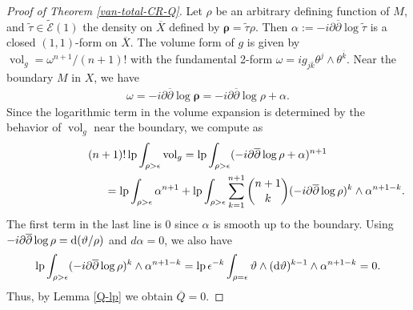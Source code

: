 \documentclass[pdftex]{sigma}
\numberwithin{equation}{section}
\begin{document}
\begin{proof}[Proof of Theorem \ref{van-total-CR-Q}] Let $\rho$ be an arbitrary def\/ining function of $M$, and $\widetilde\tau\in\widetilde{\mathcal{E}} (1)$ the density on $\overline X$ def\/ined by $\boldsymbol\rho=\widetilde\tau\rho$. Then $\alpha:=-i\partial\overline{\partial}\log\widetilde\tau$ is a closed $(1,1)$-form on $\overline X$. The volume form of $g$ is given by $\operatorname{vol}_g=\omega^{n+1}/(n+1)!$ with the fundamental 2-form $\omega=ig_{j\overline k}\theta^j\wedge\theta^{\overline k}$. Near the boundary $M$ in $X$, we have
\begin{gather*}
\omega=-i\partial\overline{\partial}\log\boldsymbol\rho=-i\partial\overline{\partial}\log\rho+\alpha.
\end{gather*}
Since the logarithmic term in the volume expansion is determined by the behavior of $\operatorname{vol}_g$ near the boundary, we compute as
\begin{gather*}
(n+1)! \operatorname{lp}\int_{\rho>\epsilon} \operatorname{vol}_g
 = \operatorname{lp}\int_{\rho>\epsilon} (-i\partial\overline{\partial}\log\rho+\alpha)^{n+1} \\
\hphantom{(n+1)! \operatorname{lp}\int_{\rho>\epsilon} \operatorname{vol}_g}{} =\operatorname{lp}\int_{\rho>\epsilon} \alpha^{n+1}+
\operatorname{lp}\int_{\rho>\epsilon} \sum_{k=1}^{n+1} \binom{n+1}{k} (-i\partial\overline{\partial}\log\rho)^{k}\wedge\alpha^{n+1-k}.
\end{gather*}
The f\/irst term in the last line is 0 since $\alpha$ is smooth up to the boundary. Using $-i\partial\overline{\partial}\log\rho={\rm d}(\vartheta/\rho)$ and $d\alpha=0$, we also have
\begin{gather*}
\operatorname{lp}\int_{\rho>\epsilon} (-i\partial\overline{\partial}\log\rho)^{k}\wedge\alpha^{n+1-k}=\operatorname{lp} \epsilon^{-k}\int_{\rho=\epsilon} \vartheta\wedge({\rm d}\vartheta)^{k-1}\wedge \alpha^{n+1-k} =0.
\end{gather*}
Thus, by Lemma \ref{Q-lp} we obtain $\overline Q=0$.
\end{proof}
\end{document}
